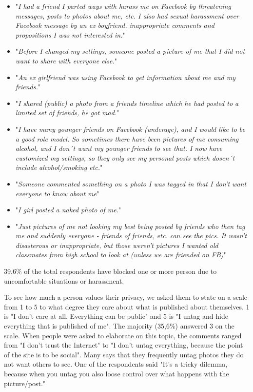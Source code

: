 \begin{itemize} 
\item "\textit{I had a friend I parted ways with harass me on Facebook by threatening messages, posts to photos about me, etc. I also had sexual harassment over Facebook message by an ex boyfriend, inappropriate comments and propositions I was not interested in.}"
\item "\textit{Before I changed my settings, someone posted a picture of me that I did not want to share with everyone else.}"
\item "\textit{An ex girlfriend was using Facebook to get information about me and my friends.}"
\item "\textit{I shared (public) a photo from a friends timeline which he had posted to a limited set of friends, he got mad.}"
\item "\textit{I have many younger friends on Facebook (underage), and I would like to be a good role model. So sometimes there have been pictures of me consuming alcohol, and I don´t want my younger friends to see that. I now have customized my settings, so they only see my personal posts which dosen´t include alcohol/smoking etc.}"
\item "\textit{Someone commented something on a photo I was tagged in that I don't want everyone to know about me}"
\item "\textit{I girl posted a naked photo of me.}"
\item "\textit{Just pictures of me not looking my best being posted by friends who then tag me and suddenly everyone - friends of friends, etc. can see the pics. It wasn't disasterous or inappropriate, but those weren't pictures I wanted old classmates from high school to look at (unless we are friended on FB)}"
\end{itemize}

39,6\% of the total respondents have blocked one or more person due to uncomfortable situations or harassment. 

To see how much a person values their privacy, we asked them to state on a scale from 1 to 5 to what degree they care about what is published about themselves. 1 is "I don't care at all. Everything can be public" and 5 is "I untag and hide everything that is published of me". The majority (35,6\%) answered 3 on the scale.  When people were asked to elaborate on this topic, the comments ranged from "I don't trust the Internet" to "I don't untag everything, because the point of the site is to be social". Many says that they frequently untag photos they do not want others to see. One of the respondents said "It's a tricky dilemma, because when you untag you also loose control over what happens with the picture/post."

